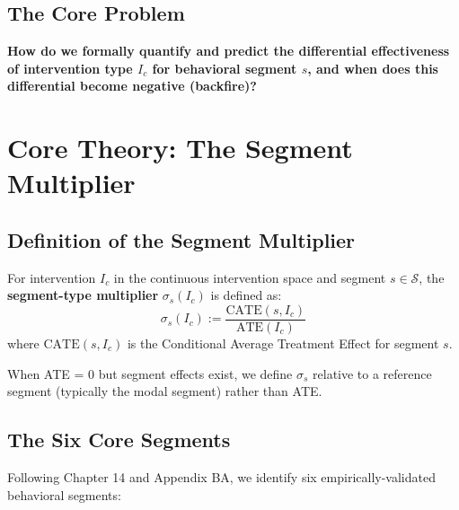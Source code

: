 \subsection{The Core Problem}

\begin{tcolorbox}[colback=red!5!white, colframe=red!75!black,
    title=The Fundamental Question]
\textbf{How do we formally quantify and predict the differential effectiveness of
intervention type $I_c$ for behavioral segment $s$, and when does this differential
become negative (backfire)?}
\end{tcolorbox}


\section{Core Theory: The Segment Multiplier}
\label{sec:qq-theory}

\subsection{Definition of the Segment Multiplier}

\begin{definition}
For intervention $I_c$ in the continuous intervention space and segment $s \in \mathcal{S}$,
the \textbf{segment-type multiplier} $\sigma_s(I_c)$ is defined as:
\begin{equation}
\sigma_s(I_c) := \frac{\text{CATE}(s, I_c)}{\text{ATE}(I_c)}
\end{equation}
where $\text{CATE}(s, I_c)$ is the Conditional Average Treatment Effect for segment $s$.
\end{definition}

\begin{remark}
When ATE = 0 but segment effects exist, we define $\sigma_s$ relative to a reference
segment (typically the modal segment) rather than ATE.
\end{remark}

\subsection{The Six Core Segments}

Following Chapter 14 and Appendix BA, we identify six empirically-validated behavioral segments:

